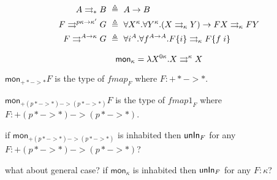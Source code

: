 \begin{align*}
A \rightrightarrows_{*} B &~\triangleq~ A -> B \\
F \rightrightarrows^{p\kappa -> \kappa'} G &~\triangleq~
	\forall X^\kappa.\forall Y^\kappa.
		(X \rightrightarrows_\kappa Y) -> F X \rightrightarrows_\kappa F Y \\
F \rightrightarrows^{A -> \kappa} G &~\triangleq~
	\forall i^A.\forall f^{A->A}. F\{i\} \rightrightarrows_\kappa F\{f\;i\}
\end{align*}

\[
\textsf{mon}_\kappa
  = \lambda X^{0\kappa}.X \rightrightarrows^\kappa X
\]

$\textsf{mon}_{+* -> *} F$ is the type of $\textit{fmap}_F$
where $F : +* -> *$.

$\textsf{mon}_{+(p* -> *)->(p* -> *)} F$ is the type of $\textit{fmap1}_F$
where $F : +(p* -> *)->(p* -> *)$.

if $\textsf{mon}_{+(p* -> *)->(p* -> *)}$ is inhabited
then $\mathsf{unIn}_F$ for any $F : +(p* -> *)->(p* -> *)$?

what about general case? if $\textsf{mon}_\kappa$ is inhabited
then $\mathsf{unIn}_F$ for any $F : \kappa$?

